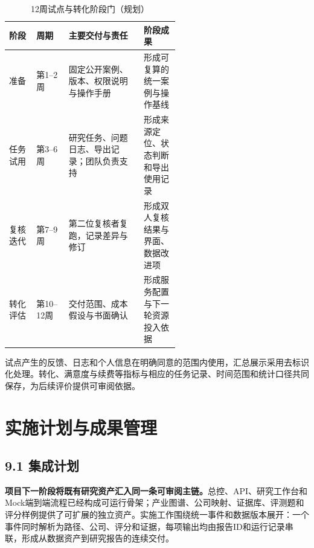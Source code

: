 \begin{table}[!htbp]
\centering
\caption{12周试点与转化阶段门（规划）}
\label{tab:wty-pilot-plan}
\small
\begin{tabularx}{\linewidth}{p{0.16\linewidth}p{0.19\linewidth}X p{0.21\linewidth}}
\toprule
阶段 & 周期 & 主要交付与责任 & 阶段成果 \\
\midrule
准备 & 第1--2周 & 固定公开案例、版本、权限说明与操作手册 & 形成可复算的统一案例与操作基线 \\
任务试用 & 第3--6周 & 研究任务、问题日志、导出记录；团队负责支持 & 形成来源定位、状态判断和导出使用记录 \\
复核迭代 & 第7--9周 & 第二位复核者复跑，记录差异与修订 & 形成双人复核结果与界面、数据改进项 \\
转化评估 & 第10--12周 & 交付范围、成本假设与书面确认 & 形成服务配置与下一轮资源投入依据 \\
\bottomrule
\end{tabularx}
\end{table}

试点产生的反馈、日志和个人信息在明确同意的范围内使用，汇总展示采用去标识化处理。转化、满意度与续费等指标与相应的任务记录、时间范围和统计口径共同保存，为后续评价提供可审阅依据。


\section{实施计划与成果管理}
\subsection*{9.1 集成计划}\label{page:39}
\noindent\textbf{项目下一阶段将既有研究资产汇入同一条可审阅主链。}总控、API、研究工作台和Mock端到端流程已经构成可运行骨架；产业图谱、公司映射、证据库、评测题和评分样例提供了可扩展的独立资产。实施工作围绕统一事件和数据版本展开：一个事件同时解析为路径、公司、评分和证据，每项输出均由报告ID和运行记录串联，形成从数据资产到研究报告的连续交付。

